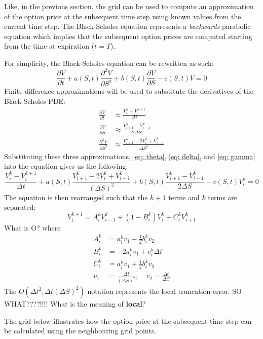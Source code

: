 Like, in the previous section, the grid can be used to compute an approximation of the option price at the subsequent time step using known values from the current time step. The Black-Scholes equation represents a \textit{backwards} parabolic equation which implies that the subsequent option prices are computed starting from the time at expiration ($t = T$). 

For simplicity, the Black-Scholes equation can be rewritten as such:
\[
\frac{\partial V}{\partial t} + a(S,t) \frac{\partial^2 V}{\partial S^2} + b(S,t) \frac{\partial V}{\partial S} - c(S,t) V = 0
\]
Finite difference approximations will be used to substitute the derivatives of the Black-Scholes PDE:
\begin{align}
\frac{\partial V}{\partial t} &\approx \frac{V_i^k - V_i^{k+1}}{\Delta t} \tag{Theta} \label{eq: theta} \\
\frac{\partial V}{\partial S} &\approx \frac{V_{i+1}^k - V_{i-1}^k}{2 \Delta S} \tag{Delta} \label{eq: delta}\\
\frac{\partial^2 V}{\partial S^2} &\approx \frac{V_{i+1}^k - 2V_i^k + V_{i-1}^k}{\Delta S^2} \tag{Gamma}\label{eq: gamma}
\end{align}
Substituting these three approximations, \eqref{eq: theta}, \eqref{eq: delta}, and \eqref{eq: gamma} into the equation gives us the following:
\[
\frac{V_i^k - V_i^{k+1}}{\Delta t} + a(S,t) \frac{V_{i+1}^k - 2V_i^k + V_{i-1}^k}{(\Delta S)^2} + b(S,t) \frac{V_{i+1}^k - V_{i-1}^k}{2 \Delta S} - c(S,t) V_i^k = 0
\]
The equation is then rearranged such that the $k+1$ terms and $k$ terms are separated:
\[
V_i^{k+1} = A_i^k V_{i-1}^k + (1-B_i^k) V_i^k + C_i^k V_{i+1}^k
\]
{\color{red}What is O?}
where
\begin{align*}
    A_i^k &= a_i^k v_1 - \frac{1}{2} b_i^k v_2 \\
    B_i^k &= -2a_i^k v_1 + c_i^k \Delta t \\
    C_i^k &= a_i^k v_1 + \frac{1}{2} b_i^k v_2 \\
    v_1 &= \frac{\Delta t}{(\Delta S)^2}, \quad v_2 = \frac{\Delta t}{\Delta S}
\end{align*}
The $O(\Delta t^2, \Delta t (\Delta S)^2)$ notation represents the local truncation error.
{\color{red}SO WHAT????!!!! What is the meaning of \textbf{local}?}

The grid below illustrates how the option price at the subsequent time step can be calculated using the neighbouring grid points.


